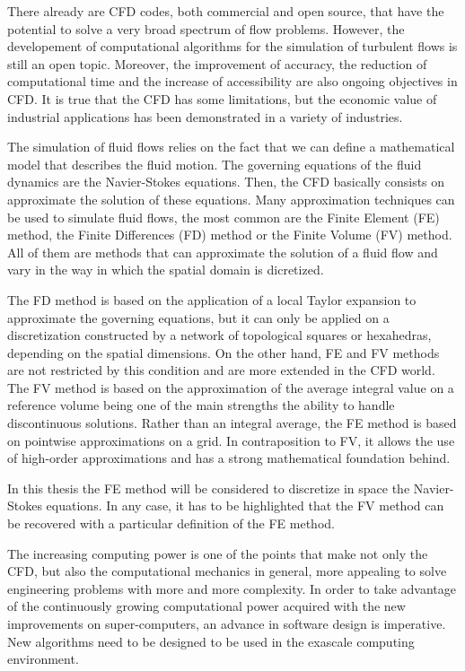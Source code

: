 There already are CFD codes, both commercial and open source, that have the potential to solve a very broad spectrum of flow problems. However, the developement of computational algorithms for the simulation of turbulent flows is still an open topic. Moreover, the improvement of accuracy, the reduction of computational time and the increase of accessibility are also ongoing objectives in CFD. It is true that the CFD has some limitations, but the economic value of industrial applications has been demonstrated in a variety of industries.

The simulation of fluid flows relies on the fact that we can define a mathematical model that describes the fluid motion. The governing equations of the fluid dynamics are the Navier-Stokes equations. Then, the CFD basically consists on approximate the solution of these equations. Many approximation techniques can be used to simulate fluid flows, the most common are the Finite Element (FE) method, the Finite Differences (FD) method or the Finite Volume (FV) method. All of them are methods that can approximate the solution of a fluid flow and vary in the way in which the spatial domain is dicretized. 

The FD method is based on the application of a local Taylor expansion to approximate the governing equations, but it can only be applied on a discretization constructed by a network of topological squares or hexahedras, depending on the spatial dimensions. On the other hand, FE and FV methods are not restricted by this condition and are more extended in the CFD world. The FV method is based on the approximation of the average integral value on a reference volume being one of the main strengths the ability to handle discontinuous solutions. Rather than an integral average, the FE method is based on pointwise approximations on a grid. In contraposition to FV, it allows the use of high-order approximations and has a strong mathematical foundation behind.

In this thesis the FE method will be considered to discretize in space the Navier-Stokes equations. In any case, it has to be highlighted that the FV method can be recovered with a particular definition of the FE method.

The increasing computing power is one of the points that make not only the CFD, but also the computational mechanics in general, more appealing to solve engineering problems with more and more complexity. In order to take advantage of the continuously growing computational power acquired with the new improvements on super-computers, an advance in software design is imperative. New algorithms need to be designed to be used in the exascale computing environment. 

